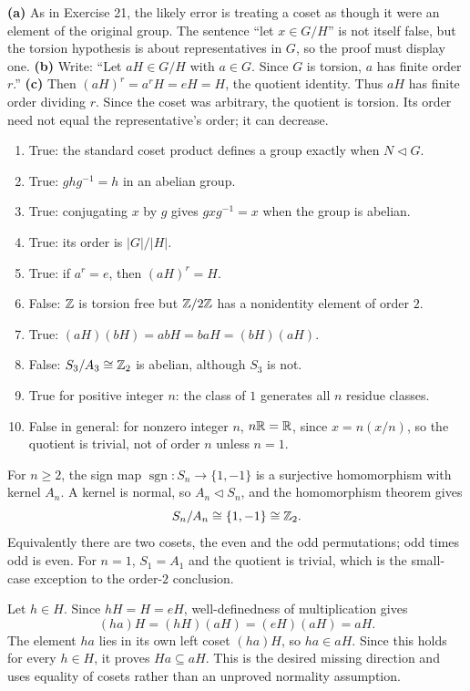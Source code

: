 \textbf{(a)} As in Exercise 21, the likely error is treating a coset as though it were an element of the original group. The sentence ``let $x\in G/H$'' is not itself false, but the torsion hypothesis is about representatives in $G$, so the proof must display one.
\textbf{(b)} Write: ``Let $aH\in G/H$ with $a\in G$. Since $G$ is torsion, $a$ has finite order $r$.''
\textbf{(c)} Then $(aH)^r=a^rH=eH=H$, the quotient identity. Thus $aH$ has finite order dividing $r$. Since the coset was arbitrary, the quotient is torsion. Its order need not equal the representative's order; it can decrease.

\begin{enumerate}[label=(\alph*)]
\item True: the standard coset product defines a group exactly when $N\triangleleft G$.
\item True: $ghg^{-1}=h$ in an abelian group.
\item True: conjugating $x$ by $g$ gives $gxg^{-1}=x$ when the group is abelian.
\item True: its order is $|G|/|H|$.
\item True: if $a^r=e$, then $(aH)^r=H$.
\item False: $\mathbb{Z}$ is torsion free but $\mathbb{Z}/2\mathbb{Z}$ has a nonidentity element of order $2$.
\item True: $(aH)(bH)=abH=baH=(bH)(aH)$.
\item False: $S_3/A_3\cong\mathbb{Z}_2$ is abelian, although $S_3$ is not.
\item True for positive integer $n$: the class of $1$ generates all $n$ residue classes.
\item False in general: for nonzero integer $n$, $n\mathbb{R}=\mathbb{R}$, since $x=n(x/n)$, so the quotient is trivial, not of order $n$ unless $n=1$.
\end{enumerate}

For $n\ge2$, the sign map $\operatorname{sgn}:S_n\to\{1,-1\}$ is a surjective homomorphism with kernel $A_n$. A kernel is normal, so $A_n\triangleleft S_n$, and the homomorphism theorem gives
\[S_n/A_n\cong\{1,-1\}\cong\mathbb{Z}_2.\]
Equivalently there are two cosets, the even and the odd permutations; odd times odd is even. For $n=1$, $S_1=A_1$ and the quotient is trivial, which is the small-case exception to the order-$2$ conclusion.

Let $h\in H$. Since $hH=H=eH$, well-definedness of multiplication gives
\[(ha)H=(hH)(aH)=(eH)(aH)=aH.\]
The element $ha$ lies in its own left coset $(ha)H$, so $ha\in aH$. Since this holds for every $h\in H$, it proves $Ha\subseteq aH$. This is the desired missing direction and uses equality of cosets rather than an unproved normality assumption.

